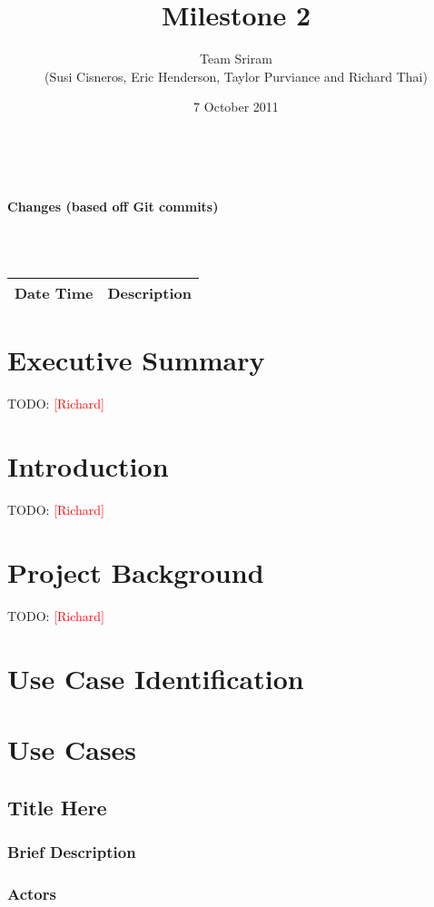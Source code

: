\documentclass{article}
\newcommand{\richard}{\textcolor{red}{[Richard]}}
\begin{document}
\setlength{\voffset}{3.5in}
\title{Milestone 2}
\author{Team Sriram\\
(Susi Cisneros, Eric Henderson, Taylor Purviance and Richard Thai)}
\date{7 October 2011}
\maketitle
\clearpage
\setlength{\voffset}{0pt}
\tableofcontents
\clearpage
~\\
\begin{Large}\textbf{Changes (based off Git commits)}\end{Large}\\
~\\
\begin{tabular}{ | p{2in} | p{4.5in} | }
\hline
\textbf{Date Time} & \textbf{Description}\\
\hline
\hline
\end{tabular}

\section{Executive Summary}
TODO: \richard

\section{Introduction}
TODO: \richard

\section{Project Background}
TODO: \richard

\section{Use Case Identification}

\section{Use Cases}
\subsection{Title Here}

\subsubsection{Brief Description}

\subsubsection{Actors}
\end{document}
